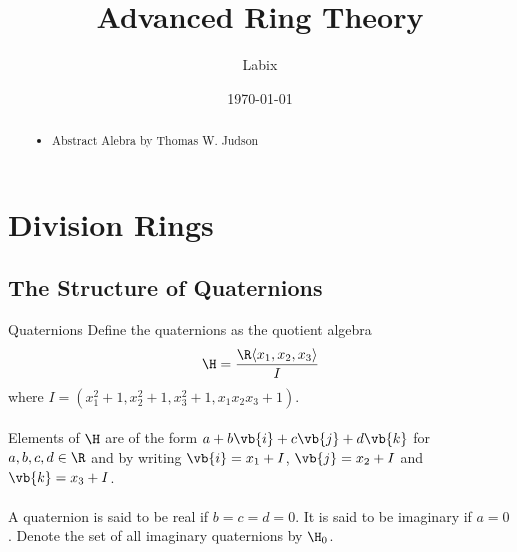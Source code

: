 \documentclass[a4paper]{article}
\title{Advanced Ring Theory}
\author{Labix}
\date{\today}
\begin{document}
\maketitle
\begin{abstract}
\begin{itemize}
\item Abstract Alebra by Thomas W. Judson
\end{itemize}
\end{abstract}
\pagebreak
\tableofcontents
\pagebreak

\section{Division Rings}
\subsection{The Structure of Quaternions}
\begin{defn}{Quaternions}{} Define the quaternions as the quotient algebra $$\H=\frac{\R\langle x_1,x_2,x_3\rangle}{I}$$ where $I=(x_1^2+1,x_2^2+1,x_3^2+1,x_1x_2x_3+1)$. \\~\\
Elements of $\H$ are of the form $a+b\vb{i}+c\vb{j}+d\vb{k}$ for $a,b,c,d\in\R$ and by writing $\vb{i}=x_1+I$, $\vb{j}=x_2+I$ and $\vb{k}=x_3+I$. \\~\\
A quaternion is said to be real if $b=c=d=0$. It is said to be imaginary if $a=0$. Denote the set of all imaginary quaternions by $\H_0$. 
\end{defn}
\end{document}
